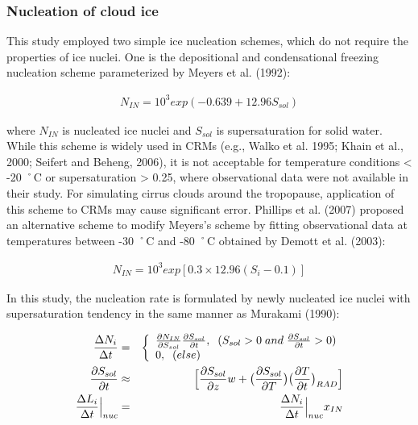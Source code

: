 \subsubsection{Nucleation of cloud ice}
This study employed two simple ice nucleation schemes, which do not require the properties of ice nuclei. One is the depositional and condensational freezing nucleation scheme parameterized by Meyers et al. (1992):

\begin{eqnarray}
N_{IN}=10^{3}exp(-0.639+12.96S_{sol})\nonumber
\end{eqnarray}

where $N_{IN}$ is nucleated ice nuclei and $S_{sol}$ is supersaturation for solid water. While this scheme is widely used in CRMs (e.g., Walko et al. 1995; Khain et al., 2000; Seifert and Beheng, 2006), it is not acceptable for temperature conditions < -20 ˚C or supersaturation > 0.25, where observational data were not available in their study. For simulating cirrus clouds around the tropopause, application of this scheme to CRMs may cause significant error. Phillips et al. (2007) proposed an alternative scheme to modify Meyers’s scheme by fitting observational data at temperatures between -30 ˚C and -80 ˚C obtained by Demott et al. (2003):

\begin{eqnarray}
N_{IN}=10^{3}exp[0.3\times12.96(S_{i}-0.1)]\label{sn117}
\end{eqnarray}

In this study, the nucleation rate is formulated by newly nucleated ice nuclei with supersaturation tendency in the same manner as Murakami (1990):

\begin{eqnarray}
\frac{\Delta N_{i}}{\Delta t}&=&
\left\{
\begin{array}{l}
\frac{\partial N_{IN}}{\partial S_{sol}}\frac{\partial S_{sol}}{\partial t},\;\;(S_{sol}>0\;and\;\frac{\partial S_{sol}}{\partial t}>0) \\
0,\;\;(else) \\
\end{array}
\right.\\
\label{sn118}
\frac{\partial S_{sol}}{\partial t}&\approx& \Bigl[\frac{\partial S_{sol}}{\partial z}w+\bigl(\frac{\partial S_{sol}}{\partial T}\bigr)\bigl(\frac{\partial T}{\partial t}\bigr)_{RAD}\Bigr]\nonumber\\
\frac{\Delta L_{i}}{\Delta t}\Bigr|_{nuc}&=&\frac{\Delta N_{i}}{\Delta t}\Bigr|_{nuc}x_{IN}\label{sn119}
\end{eqnarray}

